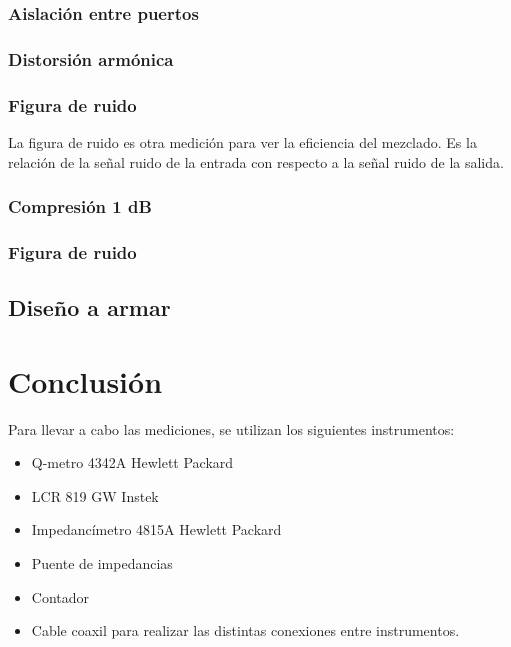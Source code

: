 \documentclass[a4paper,10pt]{article}
\begin{document}
		\subsubsection{Aislación entre puertos}

		\subsubsection{Distorsión armónica}
		
		\subsubsection{Figura de ruido}
		\indent La figura de ruido es otra medición para ver la eficiencia del 
		mezclado. Es la relación de la señal ruido de la entrada con respecto a
		la señal ruido de la salida. 
		
		\subsubsection{Compresión 1 dB}
		\subsubsection{Figura de ruido}

	\subsection{Diseño a armar}


\newpage
\section{Conclusión}

\newpage



	\indent Para llevar a cabo las mediciones, se utilizan los siguientes 
	instrumentos:
		\begin{itemize}
			\item Q-metro 4342A Hewlett Packard
			\item LCR 819 GW Instek
			\item Impedanc\'imetro 4815A Hewlett Packard
			\item Puente de impedancias
			\item Contador
			\item Cable coaxil para realizar las distintas conexiones entre 
			instrumentos.
		\end{itemize}	
	
\end{document}
